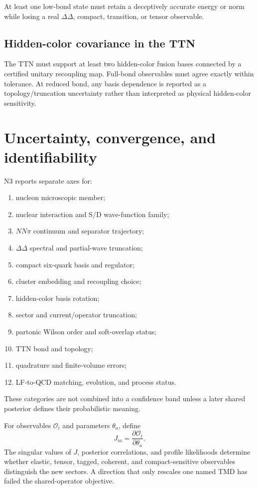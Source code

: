 \documentclass[11pt]{article}
\newcommand{\cO}{\mathcal O}
\begin{document}
At least one low-bond state must retain a deceptively accurate energy or norm while losing a real \(\Delta\Delta\), compact, transition, or tensor observable.

\subsection{Hidden-color covariance in the TTN}

The TTN must support at least two hidden-color fusion bases connected by a certified unitary recoupling map.  Full-bond observables must agree exactly within tolerance.  At reduced bond, any basis dependence is reported as a topology/truncation uncertainty rather than interpreted as physical hidden-color sensitivity.

\section{Uncertainty, convergence, and identifiability}
\label{sec:uncertainty}

N3 reports separate axes for:
\begin{enumerate}
\item nucleon microscopic member;
\item nuclear interaction and S/D wave-function family;
\item \(NN\pi\) continuum and separator trajectory;
\item \(\Delta\Delta\) spectral and partial-wave truncation;
\item compact six-quark basis and regulator;
\item cluster embedding and recoupling choice;
\item hidden-color basis rotation;
\item sector and current/operator truncation;
\item partonic Wilson order and soft-overlap status;
\item TTN bond and topology;
\item quadrature and finite-volume errors;
\item LF-to-QCD matching, evolution, and process status.
\end{enumerate}
These categories are not combined into a confidence band unless a later shared posterior defines their probabilistic meaning.

For observables \(\cO_i\) and parameters \(\theta_a\), define
\begin{equation}
 J_{ia}=\frac{\partial\cO_i}{\partial\theta_a}.
\label{eq:n3-identifiability-jacobian}
\end{equation}
The singular values of \(J\), posterior correlations, and profile likelihoods determine whether elastic, tensor, tagged, coherent, and compact-sensitive observables distinguish the new sectors.  A direction that only rescales one named TMD has failed the shared-operator objective.
\end{document}
